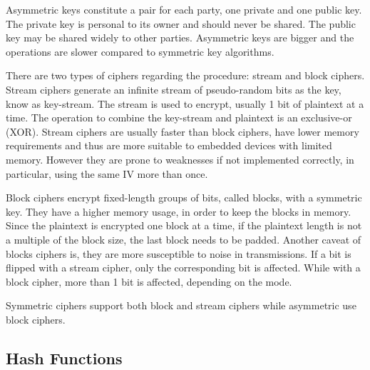 Asymmetric keys constitute a pair for each party, one private and one public key. The private key is personal to its owner and should never be shared. The public key may be shared widely to other parties. Asymmetric keys are bigger and the operations are slower compared to symmetric key algorithms.

There are two types of ciphers regarding the procedure: stream and block ciphers.
Stream ciphers generate an infinite stream of pseudo-random bits as the key, know as key-stream. The stream is used to encrypt, usually 1 bit of plaintext at a time. The operation to combine the key-stream and plaintext is an exclusive-or (XOR). Stream ciphers are usually faster than block ciphers, have lower memory requirements and thus are more suitable to embedded devices with limited memory. However they are prone to weaknesses if not implemented correctly, in particular, using the same \ac{IV} more than once. 

Block ciphers encrypt fixed-length groups of bits, called blocks, with a symmetric key. They have a higher memory usage, in order to keep the blocks in memory. Since the plaintext is encrypted one block at a time, if the plaintext length is not a multiple of the block size, the last block needs to be padded. Another caveat of blocks ciphers is, they are more susceptible to noise in transmissions. If a bit is flipped with a stream cipher, only the corresponding bit is affected. While with a block cipher, more than 1 bit is affected, depending on the mode.

Symmetric ciphers support both block and stream ciphers while asymmetric use block ciphers.

\subsection{Hash Functions}\label{chap:background:crypto:hash}

